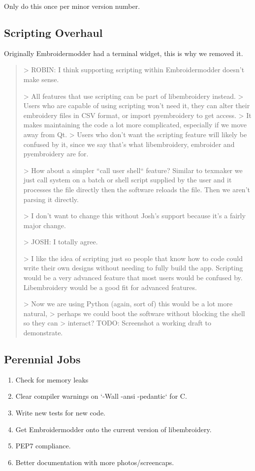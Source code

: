 \documentclass{report}
\begin{document}
Only do this once per minor version number.

\subsection{Scripting Overhaul}

Originally Embroidermodder had a terminal widget, this is why we removed it.

\begin{quote}
> ROBIN: I think supporting scripting within Embroidermodder doesn't make sense.

> All features that use scripting can be part of libembroidery instead.
> Users who are capable of using scripting won't need it, they can alter their embroidery files in CSV format, or import pyembroidery to get access.
> It makes maintaining the code a lot more complicated, especially if we move away from Qt.
> Users who don't want the scripting feature will likely be confused by it, since we say that's what libembroidery, embroider and pyembroidery are for.

> How about a simpler ``call user shell`` feature? Similar to texmaker we just call system on a batch or shell script supplied by the user and it processes the file directly then the software reloads the file. Then we aren't parsing it directly.

> I don't want to change this without Josh's support because it's a fairly major change.

> JOSH: I totally agree.

> I like the idea of scripting just so people that know how to code could write their own designs without needing to fully build the app. Scripting would be a very advanced feature that most users would be confused by. Libembroidery would be a good fit for advanced features.

> Now we are using Python (again, sort of) this would be a lot more natural,
> perhaps we could boot the software without blocking the shell so they can
> interact? TODO: Screenshot a working draft to demonstrate.
\end{quote}

\subsection{Perennial Jobs}

\begin{enumerate}
\item Check for memory leaks
\item Clear compiler warnings on `-Wall -ansi -pedantic` for C.
\item Write new tests for new code.
\item Get Embroidermodder onto the current version of libembroidery.
\item PEP7 compliance.
\item Better documentation with more photos/screencaps.
\end{enumerate}
\end{document}
